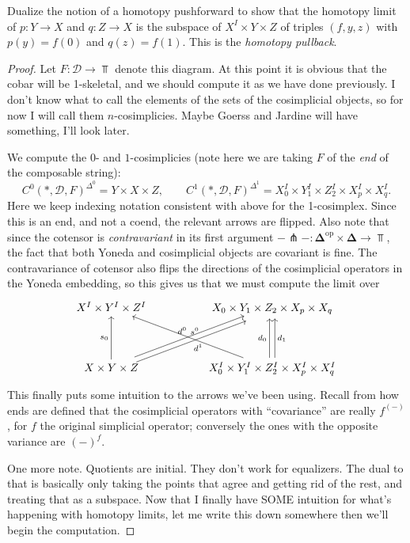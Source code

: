 \begin{exercise}
	Dualize the notion of a homotopy pushforward to show that the homotopy limit of $p : Y \to X$ and $q : Z \to X$ is the subspace of $X^I \times Y\times Z$ of triples $(f,y,z)$ with $p(y)=f(0)$ and $q(z)=f(1)$. This is the \emph{homotopy pullback}.
\end{exercise}
\begin{proof}
	Let $F : \mathcal{D}  \to \Top $ denote this diagram. At this point it is obvious that the cobar will be 1-skeletal, and we should compute it as we have done previously. I don't know what to call the elements of the sets of the cosimplicial objects, so for now I will call them $n$-cosimplicies. Maybe Goerss and Jardine will have something, I'll look later.

	We compute the $0$- and $1$-cosimplicies (note here we are taking $F$ of the \emph{end} of the composable string):
	\[
		C^0(*,\mathcal{D} ,F)^{\Delta^0} =Y\times X\times Z,\qquad C^1(*,\mathcal{D} ,F)^{\Delta^1}=X_0^I \times Y_1^I \times Z_2^I \times X_p^I \times X_q^I
	.\]
	Here we keep indexing notation consistent with above for the 1-cosimplex. Since this is an end, and not a coend, the relevant arrows are flipped. Also note that since the cotensor is \emph{contravariant} in its first argument $-\pitchfork-: \boldsymbol{\Delta}^{\mathrm{op}} \times \boldsymbol{\Delta}  \to \Top $, the fact that both Yoneda and cosimplicial objects are covariant is fine. The contravariance of cotensor also flips the directions of the cosimplicial operators in the Yoneda embedding, so this gives us that we must compute the limit over
\[\begin{tikzcd}
	{X^I\times Y^I\times Z^I} && {X_0\times Y_1\times Z_2 \times X_p \times X_q} \\
	\\
	{X\times Y\times Z} && {X_0^I \times Y_1^I \times Z_2^I \times X_p^I \times X_q^I}
	\arrow["{s_0}", from=3-1, to=1-1]
	\arrow["{d^0}", shift left, from=3-1, to=1-3]
	\arrow["{d^1}"', shift right, from=3-1, to=1-3]
	\arrow["{s^0}"', from=3-3, to=1-1]
	\arrow["{d_0}", shift left, from=3-3, to=1-3]
	\arrow["{d_1}"', shift right, from=3-3, to=1-3]
\end{tikzcd}\]
This finally puts some intuition to the arrows we've been using. Recall from how ends are defined that the cosimplicial operators with ``covariance'' are really $f^{(-)} $, for $f$ the original simplicial operator; conversely the ones with the opposite variance are $(-)^f$.

One more note. Quotients are initial. They don't work for equalizers. The dual to that is basically only taking the points that agree and getting rid of the rest, and treating that as a subspace. Now that I finally have SOME intuition for what's happening with homotopy limits, let me write this down somewhere then we'll begin the computation.


\end{proof}
